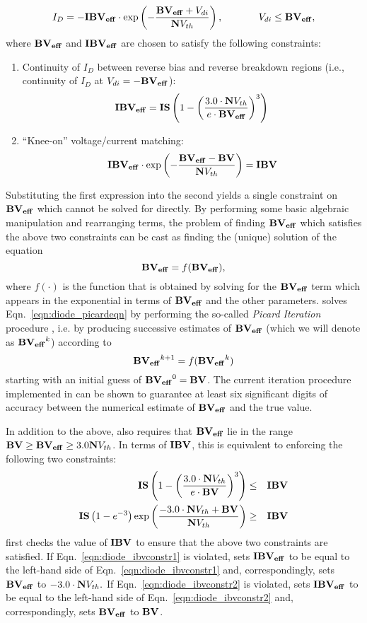 \[
I_D = -\mathbf{IBV_{eff}}\cdot\exp \left(-\frac{\mathbf{BV_{eff}} + V_{di}}{\mathbf{N}V_{th}}
\right), \hspace*{0.5in} V_{di} \leq \mathbf{BV_{eff}},
\]
where $\mathbf{BV_{eff}}$ and $\mathbf{IBV_{eff}}$ are chosen to satisfy the following
constraints:
\begin{enumerate}
\item Continuity of $I_D$ between reverse bias and reverse breakdown regions
(i.e., continuity of $I_D$ at $V_{di}=-\mathbf{BV_{eff}}$):
\[
\mathbf{IBV_{eff}}=\mathbf{IS}\left(1-\left(\frac{3.0\cdot\mathbf{N} V_{th}}{e\cdot\mathbf{BV_{eff}}}
\right)^3\right)
\]
\item ``Knee-on'' voltage/current matching:
\[
\mathbf{IBV_{eff}}\cdot\exp\left(-\frac{\mathbf{BV_{eff}}-\mathbf{BV}}{\mathbf{N} V_{th}}\right)=\mathbf{IBV}
\]
\end{enumerate}
Substituting the first expression into the second yields a single constraint
on $\mathbf{BV_{eff}}$ which cannot be solved for directly.  By performing some basic
algebraic manipulation and rearranging terms, the problem of finding
$\mathbf{BV_{eff}}$ which satisfies the above two constraints can be cast as finding
the (unique) solution of the equation
\begin{equation}
\mathbf{BV_{eff}} = f(\mathbf{BV_{eff}}),
\label{eqn:diode_picardeqn}
\end{equation}
where $f(\cdot)$ is the function that is obtained by solving for the
$\mathbf{BV_{eff}}$ term which appears in the exponential in terms of $\mathbf{BV_{eff}}$ and the
other parameters.  \Xyce{} solves Eqn.\ \ref{eqn:diode_picardeqn} by performing
the so-called {\em Picard Iteration} procedure \cite{mattuck:1999}, i.e.
by producing successive estimates of $\mathbf{BV_{eff}}$ (which we will denote as
$\mathbf{BV_{eff}} ^ k$) according to
\[
\mathbf{BV_{eff}}^{k+1}=f(\mathbf{BV_{eff}}^k)
\]
starting with an initial guess of $\mathbf{BV_{eff}}^0=\mathbf{BV}$.  The current iteration
procedure implemented in \Xyce{} can be shown to guarantee at least six
significant digits of accuracy between the numerical estimate of $\mathbf{BV_{eff}}$ and
the true value.

In addition to the above, \Xyce{} also requires that $\mathbf{BV_{eff}}$ lie in the
range \mbox{$\mathbf{BV} \geq \mathbf{BV_{eff}} \geq 3.0\mathbf{N} V_{th}$.}  In terms of $\mathbf{IBV}   $,
this is equivalent to enforcing the following two constraints:
\begin{eqnarray}
\mathbf{IS}\left(1-\left(\frac{3.0\cdot\mathbf{N} V_{th}}{e\cdot\mathbf{BV}}\right)^3\right) & \leq & \mathbf{IBV} \label{eqn:diode_ibvconstr1}\\
\mathbf{IS}\left(1-e^{-3}\right)\exp\left(\frac{-3.0\cdot\mathbf{N} V_{th}+
\mathbf{BV}}{\mathbf{N} V_{th}}\right) & \geq & \mathbf{IBV} \label{eqn:diode_ibvconstr2}
\end{eqnarray}
\Xyce{} first checks the value of $\mathbf{IBV}$ to ensure that the above two
constraints are satisfied.  If Eqn.\ \ref{eqn:diode_ibvconstr1} is violated,
\Xyce{} sets $\mathbf{IBV_{eff}}$ to be equal to the left-hand side of Eqn.\
\ref{eqn:diode_ibvconstr1} and, correspondingly, sets $\mathbf{BV_{eff}}$ to $-3.0\cdot
\mathbf{N} V_{th}.$  If Eqn.\ \ref{eqn:diode_ibvconstr2} is violated, \Xyce{} sets
$\mathbf{IBV_{eff}}$ to be equal to the left-hand side of Eqn.\
\ref{eqn:diode_ibvconstr2} and, correspondingly, sets $\mathbf{BV_{eff}}$ to $\mathbf{BV}$.

